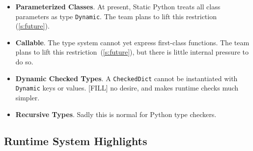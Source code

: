 \documentclass[english,cleveref,submission]{programming}
\newcommand{\SP}{Static Python}
\newcommand{\code}[1]{\texttt{#1}}
\begin{document}
\begin{itemize}
  \item \textbf{Parameterized Classes}.
    At present, \SP{} treats all class parameters as type \code{Dynamic}.
    The team plans to lift this restriction (\cref{s:future}).

  \item \textbf{Callable}.
    The type system cannot yet express first-class functions.
    The team plans to lift this restriction~(\cref{s:future}),
    but there is little internal pressure to do so.

  \item \textbf{Dynamic Checked Types}.
    A \code{CheckedDict} cannot be instantiated with \code{Dynamic}
    keys or values.
    [FILL] no desire, and makes runtime checks much simpler.

  \item \textbf{Recursive Types}.
    Sadly this is normal for Python type checkers.

\end{itemize}




\subsection{Runtime System Highlights}
\end{document}
